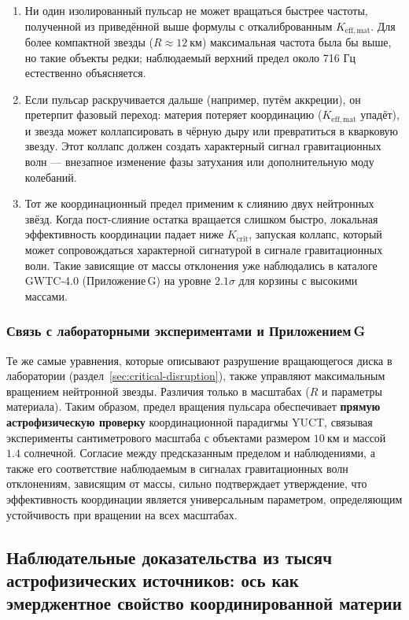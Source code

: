 \documentclass[12pt,a4paper]{article}
\begin{document}
	\begin{enumerate}
		\item Ни один изолированный пульсар не может вращаться быстрее частоты, полученной из приведённой выше формулы с откалиброванным \(K_{\mathrm{eff,mat}}\). Для более компактной звезды (\(R\approx 12\ \text{км}\)) максимальная частота была бы выше, но такие объекты редки; наблюдаемый верхний предел около 716 Гц естественно объясняется.
		\item Если пульсар раскручивается дальше (например, путём аккреции), он претерпит фазовый переход: материя потеряет координацию (\(K_{\mathrm{eff,mat}}\) упадёт), и звезда может коллапсировать в чёрную дыру или превратиться в кварковую звезду. Этот коллапс должен создать характерный сигнал гравитационных волн — внезапное изменение фазы затухания или дополнительную моду колебаний.
		\item Тот же координационный предел применим к слиянию двух нейтронных звёзд. Когда пост-слияние остатка вращается слишком быстро, локальная эффективность координации падает ниже \(K_{\mathrm{crit}}\), запуская коллапс, который может сопровождаться характерной сигнатурой в сигнале гравитационных волн. Такие зависящие от массы отклонения уже наблюдались в каталоге GWTC‑4.0 (Приложение G) на уровне \(2.1\sigma\) для корзины с высокими массами.
	\end{enumerate}
	
	\subsubsection{Связь с лабораторными экспериментами и Приложением G}
	
	Те же самые уравнения, которые описывают разрушение вращающегося диска в лаборатории (раздел~\ref{sec:critical-disruption}), также управляют максимальным вращением нейтронной звезды. Различия только в масштабах (\(R\) и параметры материала). Таким образом, предел вращения пульсара обеспечивает \textbf{прямую астрофизическую проверку} координационной парадигмы YUCT, связывая эксперименты сантиметрового масштаба с объектами размером \(10\ \text{км}\) и массой \(1.4\) солнечной. Согласие между предсказанным пределом и наблюдениями, а также его соответствие наблюдаемым в сигналах гравитационных волн отклонениям, зависящим от массы, сильно подтверждает утверждение, что эффективность координации является универсальным параметром, определяющим устойчивость при вращении на всех масштабах.
	
	\subsection{Наблюдательные доказательства из тысяч астрофизических источников: ось как эмерджентное свойство координированной материи}
	
\end{document}
